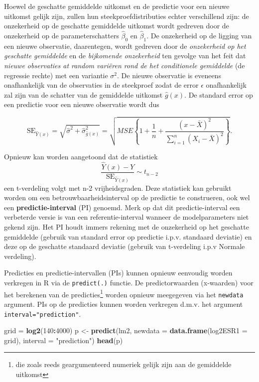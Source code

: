 \documentclass[12pt,dutch,coursenotes]{book}
\newenvironment{Shaded}{\begin{snugshade}}{\end{snugshade}}
\newcommand{\KeywordTok}[1]{\textcolor[rgb]{0.13,0.29,0.53}{\textbf{#1}}}
\newcommand{\DataTypeTok}[1]{\textcolor[rgb]{0.13,0.29,0.53}{#1}}
\newcommand{\DecValTok}[1]{\textcolor[rgb]{0.00,0.00,0.81}{#1}}
\newcommand{\StringTok}[1]{\textcolor[rgb]{0.31,0.60,0.02}{#1}}
\newcommand{\OperatorTok}[1]{\textcolor[rgb]{0.81,0.36,0.00}{\textbf{#1}}}
\newcommand{\NormalTok}[1]{#1}
\let\rmarkdownfootnote\footnote%
\def\footnote{\protect\rmarkdownfootnote}
\theoremstyle{definition}
\theoremstyle{definition}
\theoremstyle{definition}
\theoremstyle{remark}
\begin{document}
Hoewel de geschatte gemiddelde uitkomst en de predictie voor een nieuwe
uitkomst gelijk zijn, zullen hun steekproefdistributies echter
verschillend zijn: de onzekerheid op de geschatte gemiddelde uitkomst
wordt gedreven door de onzekerheid op de parameterschatters
\(\hat\beta_0\) en \(\hat\beta_1\). De onzekerheid op de ligging van een
nieuwe observatie, daarentegen, wordt gedreven door de \emph{onzekerheid
op het geschatte gemiddelde} en de \emph{bijkomende onzekerheid} ten
gevolge van het feit dat \emph{nieuwe observaties at random variëren
rond de het conditionele gemiddelde} (de regressie rechte) met een
variantie \(\sigma^2\). De nieuwe observatie is eveneens onafhankelijk
van de observaties in de steekproef zodat de error \(\epsilon\)
onafhankelijk zal zijn van de schatter van de gemiddelde uitkomst
\(\hat{g}(x)\). De standard error op een predictie voor een nieuwe
observatie wordt dus

\[\text{SE}_{\hat{Y}(x)}=\sqrt{\hat\sigma^2+\hat\sigma^2_{\hat{g}(x)}}=\sqrt{MSE\left\{1+\frac{1}{n}+\frac{(x-\bar X)^2}{\sum\limits_{i=1}^n (X_i-\bar X)^2}\right\}}.\]

Opnieuw kan worden aangetoond dat de statistiek
\[\frac{\hat{Y}(x)-Y}{\text{SE}_{\hat{Y}(x)}}\sim t_{n-2}\] een
t-verdeling volgt met n-2 vrijheidsgraden. Deze statistiek kan gebruikt
worden om een betrouwbaarheidsinterval op de predictie te construeren,
ook wel een \textbf{predictie-interval} (PI) genoemd. Merk op dat dit
predictie-interval een verbeterde versie is van een referentie-interval
wanneer de modelparameters niet gekend zijn. Het PI houdt immers
rekening met de onzekerheid op het geschatte gemiddelde (gebruik van
standard error op predictie i.p.v. standaard deviatie) en deze op de
geschatte standaard deviatie (gebruik van t-verdeling i.p.v Normale
verdeling).

Predicties en predictie-intervallen (PIs) kunnen opnieuw eenvoudig
worden verkregen in R via de \texttt{predict(.)} functie. De
predictorwaarden (x-waarden) voor het berekenen van de
predicties\footnote{die zoals reeds geargumenteerd numeriek gelijk zijn
  aan de gemiddelde uitkomst} worden opnieuw meegegeven via het
\texttt{newdata} argument. PIs op de predicties kunnen worden verkregen
d.m.v. het argument \texttt{interval="prediction"}.

\begin{Shaded}
\begin{Highlighting}[]
\NormalTok{grid =}\StringTok{ }\KeywordTok{log2}\NormalTok{(}\DecValTok{140}\OperatorTok{:}\DecValTok{4000}\NormalTok{)}
\NormalTok{p <-}\StringTok{ }\KeywordTok{predict}\NormalTok{(lm2, }\DataTypeTok{newdata =} \KeywordTok{data.frame}\NormalTok{(}\DataTypeTok{log2ESR1 =}\NormalTok{ grid), }
    \DataTypeTok{interval =} \StringTok{"prediction"}\NormalTok{)}
\KeywordTok{head}\NormalTok{(p)}
\end{Highlighting}
\end{Shaded}
\end{document}
